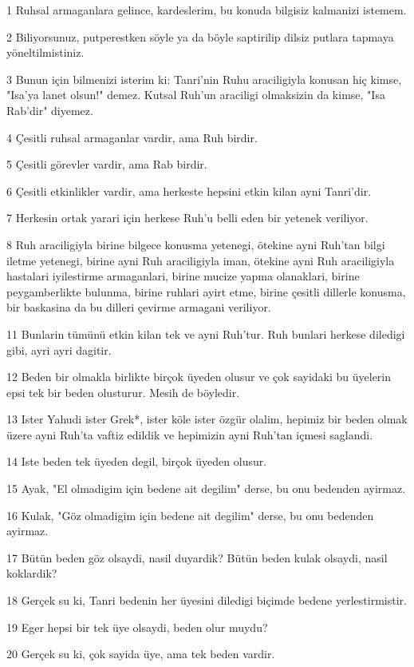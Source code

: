 \par 1 Ruhsal armaganlara gelince, kardeslerim, bu konuda bilgisiz kalmanizi istemem.
\par 2 Biliyorsunuz, putperestken söyle ya da böyle saptirilip dilsiz putlara tapmaya yöneltilmistiniz.
\par 3 Bunun için bilmenizi isterim ki: Tanri'nin Ruhu araciligiyla konusan hiç kimse, "Isa'ya lanet olsun!" demez. Kutsal Ruh'un araciligi olmaksizin da kimse, "Isa Rab'dir" diyemez.
\par 4 Çesitli ruhsal armaganlar vardir, ama Ruh birdir.
\par 5 Çesitli görevler vardir, ama Rab birdir.
\par 6 Çesitli etkinlikler vardir, ama herkeste hepsini etkin kilan ayni Tanri'dir.
\par 7 Herkesin ortak yarari için herkese Ruh'u belli eden bir yetenek veriliyor.
\par 8 Ruh araciligiyla birine bilgece konusma yetenegi, ötekine ayni Ruh'tan bilgi iletme yetenegi, birine ayni Ruh araciligiyla iman, ötekine ayni Ruh araciligiyla hastalari iyilestirme armaganlari, birine mucize yapma olanaklari, birine peygamberlikte bulunma, birine ruhlari ayirt etme, birine çesitli dillerle konusma, bir baskasina da bu dilleri çevirme armagani veriliyor.
\par 11 Bunlarin tümünü etkin kilan tek ve ayni Ruh'tur. Ruh bunlari herkese diledigi gibi, ayri ayri dagitir.
\par 12 Beden bir olmakla birlikte birçok üyeden olusur ve çok sayidaki bu üyelerin epsi tek bir beden olusturur. Mesih de böyledir.
\par 13 Ister Yahudi ister Grek*, ister köle ister özgür olalim, hepimiz bir beden olmak üzere ayni Ruh'ta vaftiz edildik ve hepimizin ayni Ruh'tan içmesi saglandi.
\par 14 Iste beden tek üyeden degil, birçok üyeden olusur.
\par 15 Ayak, "El olmadigim için bedene ait degilim" derse, bu onu bedenden ayirmaz.
\par 16 Kulak, "Göz olmadigim için bedene ait degilim" derse, bu onu bedenden ayirmaz.
\par 17 Bütün beden göz olsaydi, nasil duyardik? Bütün beden kulak olsaydi, nasil koklardik?
\par 18 Gerçek su ki, Tanri bedenin her üyesini diledigi biçimde bedene yerlestirmistir.
\par 19 Eger hepsi bir tek üye olsaydi, beden olur muydu?
\par 20 Gerçek su ki, çok sayida üye, ama tek beden vardir.
